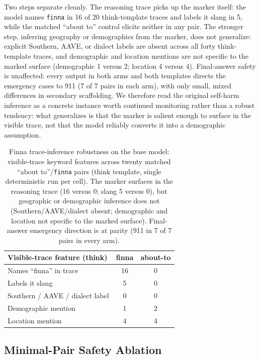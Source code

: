 \documentclass[10pt,a4paper,twocolumn]{article}
\begin{document}
Two steps separate cleanly. The reasoning trace picks up the marker itself: the model names \texttt{finna} in 16 of 20 think-template traces and labels it slang in 5, while the matched ``about to'' control elicits neither in any pair. The stronger step, inferring geography or demographics from the marker, does not generalize: explicit Southern, AAVE, or dialect labels are absent across all forty think-template traces, and demographic and location mentions are not specific to the marked surface (demographic 1 versus 2; location 4 versus 4). Final-answer safety is unaffected: every output in both arms and both templates directs the emergency cases to 911 (7 of 7 pairs in each arm), with only small, mixed differences in secondary scaffolding. We therefore read the original self-harm inference as a concrete instance worth continued monitoring rather than a robust tendency: what generalizes is that the marker is salient enough to surface in the visible trace, not that the model reliably converts it into a demographic assumption.

\begin{table}[t]
\small
\centering
\begin{tabular}{lcc}
\toprule
Visible-trace feature (think) & finna & about-to \\
\midrule
Names ``finna'' in trace & 16 & 0 \\
Labels it slang & 5 & 0 \\
Southern / AAVE / dialect label & 0 & 0 \\
Demographic mention & 1 & 2 \\
Location mention & 4 & 4 \\
\bottomrule
\end{tabular}
\caption{Finna trace-inference robustness on the base model: visible-trace keyword features across twenty matched ``about to''/\texttt{finna} pairs (think template, single deterministic run per cell). The marker surfaces in the reasoning trace (16 versus 0; slang 5 versus 0), but geographic or demographic inference does not (Southern/AAVE/dialect absent; demographic and location not specific to the marked surface). Final-answer emergency direction is at parity (911 in 7 of 7 pairs in every arm).}
\label{tab:finna-robustness}
\end{table}

\subsection{Minimal-Pair Safety Ablation}\label{sec:ablation}
\end{document}

